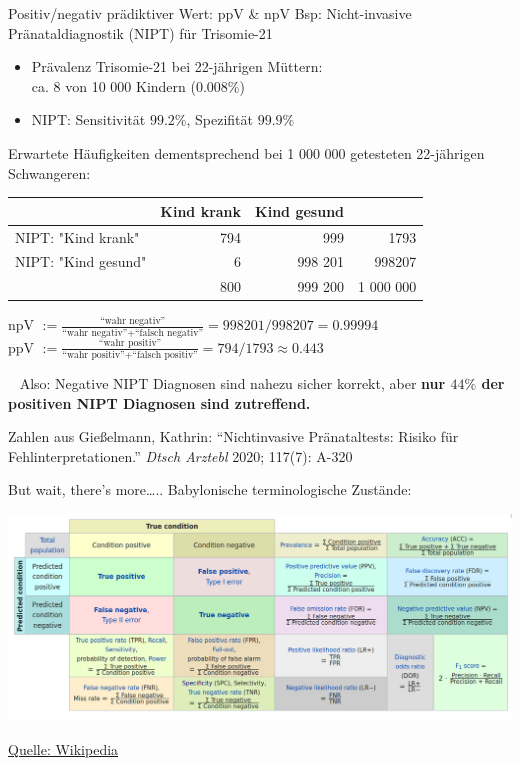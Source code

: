 \documentclass[
  10pt,
  ignorenonframetext,
]{beamer}
\providecommand{\tightlist}{%
  \setlength{\itemsep}{0pt}\setlength{\parskip}{0pt}}
\begin{document}
\begin{frame}{Positiv/negativ prädiktiver Wert: ppV \& npV}
\label{positivnegativ-pruxe4diktiver-wert-ppv-npv}
Bsp: Nicht-invasive Pränataldiagnostik (NIPT) für Trisomie-21

\begin{itemize}
\tightlist
\item
  Prävalenz Trisomie-21 bei 22-jährigen Müttern:\\
  ca. 8 von 10 000 Kindern (0.008\%)\\
\item
  NIPT: Sensitivität \(99.2\%\), Spezifität \(99.9\%\)
\end{itemize}

Erwartete Häufigkeiten dementsprechend bei 1 000 000 getesteten
22-jährigen Schwangeren:

\begin{tabular}{l|r r|r}
&  Kind krank & Kind gesund &\\
\hline
NIPT: "Kind krank" & 794 & 999 & 1793\\
NIPT: "Kind gesund" & 6 & 998 201  & 998207\\
\hline
& 800 & 999 200 & 1 000 000
\end{tabular}

npV
\(:= \frac{\text{``wahr negativ''}}{\text{``wahr negativ''} + \text{``falsch negativ''}}= 998201/998207 = 0.99994\)\\
ppV
\(:= \frac{\text{``wahr positiv''}}{\text{``wahr positiv''} + \text{``falsch positiv''}}= 794/1793 \approx 0.443\)

~ Also: Negative NIPT Diagnosen sind nahezu sicher korrekt, aber
\textbf{nur \(44\%\) der positiven NIPT Diagnosen sind zutreffend.}

\tiny

Zahlen aus Gießelmann, Kathrin: ``Nichtinvasive Pränataltests: Risiko
für Fehlinterpretationen.'' \emph{Dtsch Arztebl} 2020; 117(7): A-320
\tiny
\end{frame}

\begin{frame}{But wait, there's more\ldots..}
\label{but-wait-theres-more..}
Babylonische terminologische Zustände:

\includegraphics{pics/04-confusion-matrix-wikipedia.png}

\scriptsize

\href{https://en.wikipedia.org/wiki/Confusion_matrix}{Quelle: Wikipedia}
\end{frame}
\end{document}
